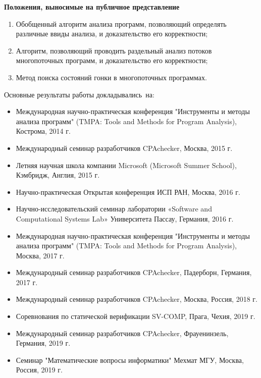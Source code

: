 \textbf{Положения, выносимые на публичное представление}
\begin{enumerate}
  \item Обобщенный алгоритм анализа программ, позволяющий определять различные ввиды анализа, и доказательство его корректности;
  \item Алгоритм, позволяющий проводить раздельный анализ потоков многопоточных программ, и доказательство его корректности;
  \item Метод поиска состояний гонки в многопоточных программах.
\end{enumerate}


{\probation}
Основные результаты работы докладывались~на:
\begin{itemize}
  \item Международная научно-практическая конференция "Инструменты и методы анализа программ" (TMPA: Tools and Methods for Program Analysis), Кострома, 2014 г.
  \item Международный семинар разработчиков CPAchecker, Москва, 2015 г.
  \item Летняя научная школа компании Microsoft (Microsoft Summer School), Кэмбридж, Англия, 2015 г.
  \item Научно-практическая Открытая конференция ИСП РАН, Москва, 2016 г.
  \item Научно-исследовательский семинар лаборатории «Software and Computational Systems Lab» Университета Пассау, Германия, 2016 г.
  \item Международная научно-практическая конференция "Инструменты и методы анализа программ" (TMPA: Tools and Methods for Program Analysis), Москва, 2017 г.
  \item Международный семинар разработчиков CPAchecker, Падерборн, Германия, 2017 г.
  \item Международный семинар разработчиков CPAchecker, Москва, Россия, 2018 г.
  \item Соревнования по статической верификации SV-COMP, Прага, Чехия, 2019 г.
  \item Международный семинар разработчиков CPAchecker, Фрауенинзель, Германия, 2019 г.
  \item Семинар "Математические вопросы информатики" Мехмат МГУ, Москва, Россия, 2019 г.
\end{itemize}

